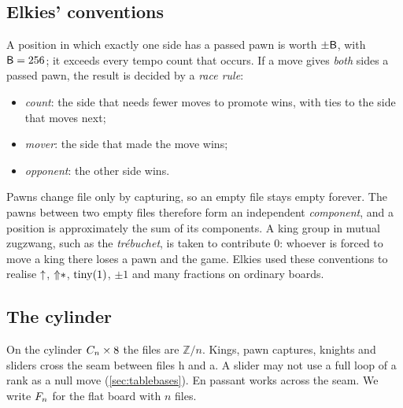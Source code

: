 \subsection{Elkies' conventions}\label{sec:conventions}
\begin{convention}\label{conv:big}
A position in which exactly one side has a passed pawn is worth $\pm\mathsf{B}$, with $\mathsf{B}=256$; it exceeds every
tempo count that occurs. If a move gives \emph{both} sides a passed pawn, the result is decided by a
\emph{race rule}:
\begin{itemize}
\item \emph{count}: the side that needs fewer moves to promote wins, with ties to the side that moves next;
\item \emph{mover}: the side that made the move wins;
\item \emph{opponent}: the other side wins.
\end{itemize}
\end{convention}
Pawns change file only by capturing, so an empty file stays empty forever. The pawns between two empty files
therefore form an independent \emph{component}, and a position is approximately the sum of its components.
A king group in mutual zugzwang, such as the \emph{tr\'ebuchet}, is taken to contribute $0$: whoever is forced
to move a king there loses a pawn and the game. Elkies used these conventions to realise $\mathord{\uparrow}$, $\mathord{\Uparrow}\mathord{\ast}$,
$\operatorname{tiny}(1)$, $\pm1$ and many fractions on ordinary boards.

\subsection{The cylinder}
On the cylinder $C_{n}\times 8$ the files are $\mathbb{Z}/n$. Kings, pawn captures, knights and sliders
cross the seam between files h and a. A slider may not use a full loop of a rank as a null move
(\cref{sec:tablebases}). En passant works across the seam. We write $F_{n}$ for the flat board with $n$ files.
